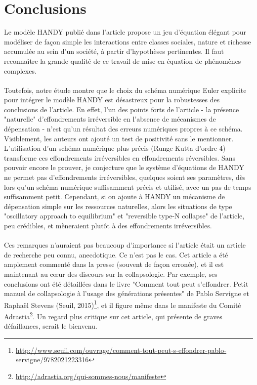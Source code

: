 \documentclass[12pt]{scrartcl}
\begin{document}
\section{Conclusions}
Le modèle HANDY publié dans l'article \citet{motesharrei_2014} propose un jeu d'équation élégant pour modéliser de façon simple les interactions entre classes sociales, nature et richesse accumulée au sein d'un société, à partir d'hypothèses pertinentes. Il faut reconnaître la grande qualité de ce travail de mise en équation de phénomènes complexes.\\
$  $\\
Toutefois, notre étude montre que le choix du schéma numérique Euler explicite pour intégrer le modèle HANDY est désastreux pour la robustesses des conclusions de l'article. En effet, l'un des points forts de l'article - la présence "naturelle" d'effondrements irréversible en l'absence de mécanismes de dépensation - n'est qu'un résultat des erreurs numériques propres à ce schéma. Visiblement, les auteurs ont ajouté un test de positivité sans le mentionner. L'utilisation d'un schéma numérique plus précis (Runge-Kutta d'ordre 4) transforme ces effondrements irréversibles en effondrements réversibles. Sans pouvoir encore le prouver, je conjecture que le système d'équations de HANDY ne permet pas d'effondrements irréversibles, quelques soient ses paramètres, dès lors qu'un schéma numérique suffisamment précis et utilisé, avec un pas de temps suffisamment petit.
Cependant, si on ajoute à HANDY un mécanisme de dépensation simple sur les ressources naturelles, alors les situations de type "oscillatory approach to equilibrium" et "reversible type-N collapse" de l'article, peu crédibles, et mèneraient plutôt à des effondrements irréversibles.\\
$  $\\
Ces remarques n'auraient pas beaucoup d'importance si l'article \citet{motesharrei_2014} était un article de recherche peu connu, anecdotique. Ce n'est pas le cas. Cet article a été amplement commenté dans la presse (souvent de façon erronée), et il est maintenant au cœur des discours sur la collapsologie. Par exemple, ses conclusions ont été détaillées dans le livre "Comment tout peut s'effondrer. Petit manuel de collapsologie à l'usage des générations présentes" de Pablo Servigne et Raphaël Stevens (Seuil, 2015)\footnote{\url{http://www.seuil.com/ouvrage/comment-tout-peut-s-effondrer-pablo-servigne/9782021223316}}, et il figure même dans le manifeste du Comité Adrastia\footnote{\url{http://adrastia.org/qui-sommes-nous/manifeste}}. Un regard plus critique sur cet article, qui présente de graves défaillances, serait le bienvenu.



\end{document}
